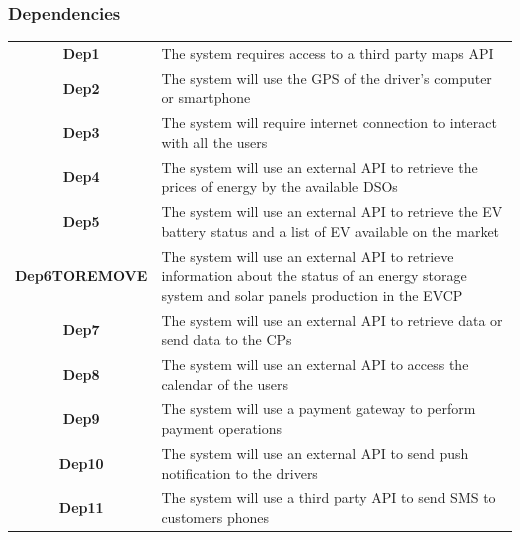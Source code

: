 \subsubsection*{Dependencies}
\begin{table}[H]
      \begin{tabularx}{\textwidth}{cX}
            \toprule
            \textbf{Dep1}         & The system requires access to a third party maps API                                                                                             \\
            \textbf{Dep2}         & The system will use the GPS of the driver's computer or smartphone                                                                               \\
            \textbf{Dep3}         & The system will require internet connection to interact with all the users                                                                       \\
            \textbf{Dep4}         & The system will use an external API to retrieve the prices of energy by the available DSOs                                                       \\
            \textbf{Dep5}         & The system will use an external API to retrieve the EV battery status and a list of EV available on the market                                   \\
            \textbf{Dep6TOREMOVE} & The system will use an external API to retrieve information about the status of an energy storage system and solar panels production in the EVCP \\
            \textbf{Dep7}         & The system will use an external API to retrieve data or send data to the CPs                                                                     \\
            \textbf{Dep8}         & The system will use an external API to access the calendar of the users                                                                          \\
            \textbf{Dep9}         & The system will use a payment gateway to perform payment operations                                                                              \\
            \textbf{Dep10}        & The system will use an external API to send push notification to the drivers                                                                     \\
            \textbf{Dep11}        & The system will use a third party API to send SMS to customers phones                                                                            \\
            \bottomrule
      \end{tabularx}
\end{table}
